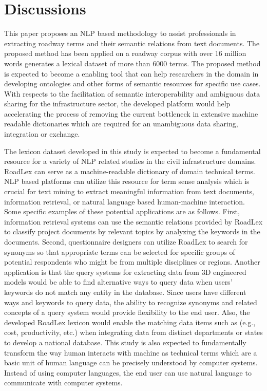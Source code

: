 \documentclass[Journal,InsideFigs, DoubleSpace]{ascelike} %
\begin{document}
%
\section{Discussions} \label{sec:dis}
This paper proposes an NLP based methodology to assist professionals in extracting roadway terms and their semantic relations from text documents. The proposed method has been applied on a roadway corpus with over 16 million words generates a lexical dataset of more than 6000 terms. The proposed method is expected to become a enabling tool that can help researchers in the domain in developing ontologies and other forms of semantic resources for specific use cases. With respects to the facilitation of semantic interoperability and ambiguous data sharing for the infrastructure sector, the developed platform would help accelerating the process of removing the current bottleneck in extensive machine readable dictionaries which are required for an unambiguous data sharing, integration or exchange. 
\par
The lexicon dataset developed in this study is expected to become a fundamental resource for a variety of NLP related studies in the civil infrastructure domains. RoadLex can serve as a machine-readable dictionary of domain technical terms. NLP based platforms can utilize this resource for term sense analysis which is crucial for text mining to extract meaningful information from text documents, information retrieval, or natural language based human-machine interaction. Some specific examples of these potential applications are as follows. First, information retrieval systems can use the semantic relations provided by RoadLex to classify project documents by relevant topics by analyzing the keywords in the documents. Second, questionnaire designers can utilize RoadLex to search for synonyms so that appropriate terms can be selected for specific groups of potential respondents who might be from multiple disciplines or regions. Another application is that the query systems for extracting data from 3D engineered models would be able to find alternative ways to query data when users' keywords do not match any entity in the database. Since users have different ways and keywords to query data, the ability to recognize synonyms and related concepts of a query system would provide flexibility to the end user. Also, the developed RoadLex lexicon would enable the matching data items such as (e.g., cost, productivity, etc.) when integrating data from distinct departments or states to develop a national database. This study is also expected to fundamentally transform the way human interacts with machine as technical terms which are a basic unit of human language can be precisely understood by computer systems. Instead of using computer languages, the end user can use natural language to communicate with computer systems.
\end{document}
